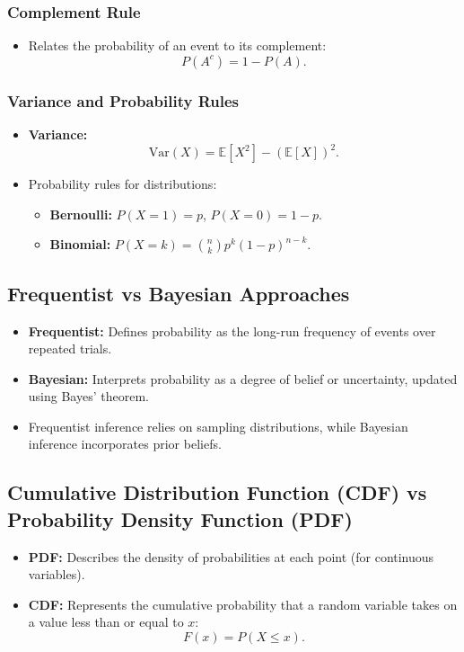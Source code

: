 \documentclass[12pt,a4paper]{article}
\begin{document}
\subsubsection{Complement Rule}
\begin{itemize}
    \item Relates the probability of an event to its complement:
    \[ P(A^c) = 1 - P(A). \]
\end{itemize}

\subsubsection{Variance and Probability Rules}
\begin{itemize}
    \item \textbf{Variance:}
    \[ \text{Var}(X) = \mathbb{E}[X^2] - (\mathbb{E}[X])^2. \]
    \item Probability rules for distributions:
    \begin{itemize}
        \item \textbf{Bernoulli:} $P(X=1) = p$, $P(X=0) = 1-p$.
        \item \textbf{Binomial:} $P(X = k) = \binom{n}{k} p^k (1-p)^{n-k}$.
    \end{itemize}
\end{itemize}
\subsection{Frequentist vs Bayesian Approaches}
\begin{itemize}
    \item \textbf{Frequentist:} Defines probability as the long-run frequency of events over repeated trials.
    \item \textbf{Bayesian:} Interprets probability as a degree of belief or uncertainty, updated using Bayes' theorem.
    \item Frequentist inference relies on sampling distributions, while Bayesian inference incorporates prior beliefs.
\end{itemize}

\subsection{Cumulative Distribution Function (CDF) vs Probability Density Function (PDF)}
\begin{itemize}
    \item \textbf{PDF:} Describes the density of probabilities at each point (for continuous variables).
    \item \textbf{CDF:} Represents the cumulative probability that a random variable takes on a value less than or equal to $x$:
    \[ F(x) = P(X \leq x). \]
\end{itemize}
\end{document}
